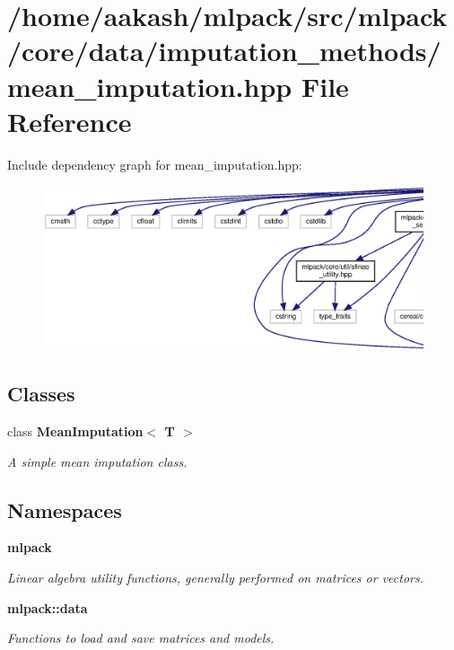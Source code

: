 \section{/home/aakash/mlpack/src/mlpack/core/data/imputation\+\_\+methods/mean\+\_\+imputation.hpp File Reference}
\label{mean__imputation_8hpp}
Include dependency graph for mean\+\_\+imputation.\+hpp\+:
\nopagebreak
\begin{figure}[H]
\begin{center}
\leavevmode
\includegraphics[width=350pt]{mean__imputation_8hpp__incl}
\end{center}
\end{figure}
\subsection*{Classes}
\begin{DoxyCompactItemize}
\item 
class \textbf{ Mean\+Imputation$<$ T $>$}
\begin{DoxyCompactList}\small\item\em A simple mean imputation class. \end{DoxyCompactList}\end{DoxyCompactItemize}
\subsection*{Namespaces}
\begin{DoxyCompactItemize}
\item 
 \textbf{ mlpack}
\begin{DoxyCompactList}\small\item\em Linear algebra utility functions, generally performed on matrices or vectors. \end{DoxyCompactList}\item 
 \textbf{ mlpack\+::data}
\begin{DoxyCompactList}\small\item\em Functions to load and save matrices and models. \end{DoxyCompactList}\end{DoxyCompactItemize}



